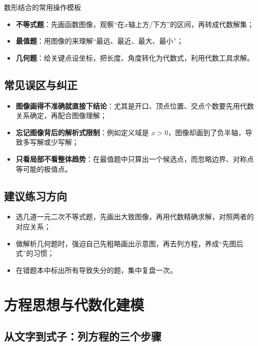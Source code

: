 \documentclass[a4paper,11pt]{ctexart}
\begin{document}
\begin{summarybox}{数形结合的常用操作模板}
\begin{itemize}
  \item \textbf{不等式题}：先画函数图像，观察“在$x$轴上方/下方”的区间，再转成代数解集；
  \item \textbf{最值题}：用图像的来理解“最远、最近、最大、最小”；
  \item \textbf{几何题}：给关键点设坐标，把长度、角度转化为代数式，利用代数工具求解。
\end{itemize}
\end{summarybox}

\subsection{常见误区与纠正}

\begin{itemize}
  \item \textbf{图像画得不准确就直接下结论}：尤其是开口、顶点位置、交点个数要先用代数关系确定，再配合图像理解；
  \item \textbf{忘记图像背后的解析式限制}：例如定义域是 $x>0$，图像却画到了负半轴，导致多写解或少写解；
  \item \textbf{只看局部不看整体趋势}：在最值题中只算出一个候选点，而忽略边界、对称点等可能的极值点。
\end{itemize}

\subsection{建议练习方向}

\begin{itemize}
  \item 选几道一元二次不等式题，先画出大致图像，再用代数精确求解，对照两者的对应关系；
  \item 做解析几何题时，强迫自己先粗略画出示意图，再去列方程，养成“先图后式”的习惯；
  \item 在错题本中标出所有导致失分的题，集中复盘一次。
\end{itemize}

\section{方程思想与代数化建模}

\subsection{从文字到式子：列方程的三个步骤}
\end{document}

